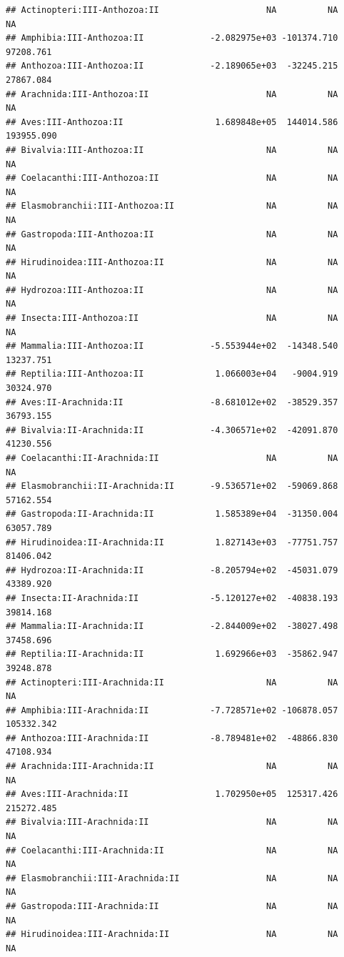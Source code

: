\documentclass[
  12pt,
]{article}
\begin{document}
\begin{verbatim}
## Actinopteri:III-Anthozoa:II                     NA          NA          NA
## Amphibia:III-Anthozoa:II             -2.082975e+03 -101374.710   97208.761
## Anthozoa:III-Anthozoa:II             -2.189065e+03  -32245.215   27867.084
## Arachnida:III-Anthozoa:II                       NA          NA          NA
## Aves:III-Anthozoa:II                  1.689848e+05  144014.586  193955.090
## Bivalvia:III-Anthozoa:II                        NA          NA          NA
## Coelacanthi:III-Anthozoa:II                     NA          NA          NA
## Elasmobranchii:III-Anthozoa:II                  NA          NA          NA
## Gastropoda:III-Anthozoa:II                      NA          NA          NA
## Hirudinoidea:III-Anthozoa:II                    NA          NA          NA
## Hydrozoa:III-Anthozoa:II                        NA          NA          NA
## Insecta:III-Anthozoa:II                         NA          NA          NA
## Mammalia:III-Anthozoa:II             -5.553944e+02  -14348.540   13237.751
## Reptilia:III-Anthozoa:II              1.066003e+04   -9004.919   30324.970
## Aves:II-Arachnida:II                 -8.681012e+02  -38529.357   36793.155
## Bivalvia:II-Arachnida:II             -4.306571e+02  -42091.870   41230.556
## Coelacanthi:II-Arachnida:II                     NA          NA          NA
## Elasmobranchii:II-Arachnida:II       -9.536571e+02  -59069.868   57162.554
## Gastropoda:II-Arachnida:II            1.585389e+04  -31350.004   63057.789
## Hirudinoidea:II-Arachnida:II          1.827143e+03  -77751.757   81406.042
## Hydrozoa:II-Arachnida:II             -8.205794e+02  -45031.079   43389.920
## Insecta:II-Arachnida:II              -5.120127e+02  -40838.193   39814.168
## Mammalia:II-Arachnida:II             -2.844009e+02  -38027.498   37458.696
## Reptilia:II-Arachnida:II              1.692966e+03  -35862.947   39248.878
## Actinopteri:III-Arachnida:II                    NA          NA          NA
## Amphibia:III-Arachnida:II            -7.728571e+02 -106878.057  105332.342
## Anthozoa:III-Arachnida:II            -8.789481e+02  -48866.830   47108.934
## Arachnida:III-Arachnida:II                      NA          NA          NA
## Aves:III-Arachnida:II                 1.702950e+05  125317.426  215272.485
## Bivalvia:III-Arachnida:II                       NA          NA          NA
## Coelacanthi:III-Arachnida:II                    NA          NA          NA
## Elasmobranchii:III-Arachnida:II                 NA          NA          NA
## Gastropoda:III-Arachnida:II                     NA          NA          NA
## Hirudinoidea:III-Arachnida:II                   NA          NA          NA

\end{verbatim}
\end{document}
